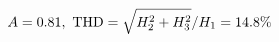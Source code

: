 \documentclass[preview]{standalone}
\begin{document}
\begin{align*}
\special{dvisvgm:raw <g id='unique000'>}A=0.81,\ \text{THD}=\sqrt{H_2^2+H_3^2}/H_1=14.8\%\special{dvisvgm:raw </g>}
\end{align*}
\end{document}
